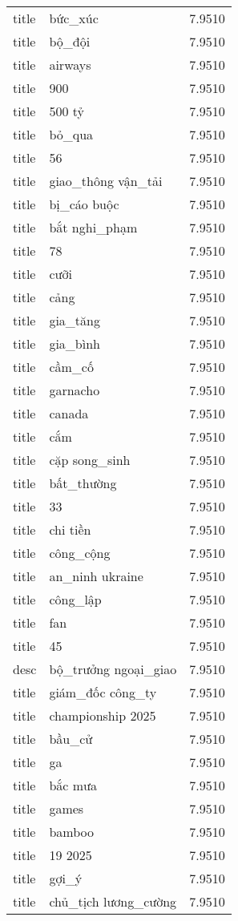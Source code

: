 \documentclass{article}
\begin{document}
\begin{tabular}{lll}
title & bức\_xúc & 7.9510\\
title & bộ\_đội & 7.9510\\
title & airways & 7.9510\\
title & 900 & 7.9510\\
title & 500 tỷ & 7.9510\\
title & bỏ\_qua & 7.9510\\
title & 56 & 7.9510\\
title & giao\_thông vận\_tải & 7.9510\\
title & bị\_cáo buộc & 7.9510\\
title & bắt nghi\_phạm & 7.9510\\
title & 78 & 7.9510\\
title & cưỡi & 7.9510\\
title & cảng & 7.9510\\
title & gia\_tăng & 7.9510\\
title & gia\_bình & 7.9510\\
title & cầm\_cố & 7.9510\\
title & garnacho & 7.9510\\
title & canada & 7.9510\\
title & cắm & 7.9510\\
title & cặp song\_sinh & 7.9510\\
title & bất\_thường & 7.9510\\
title & 33 & 7.9510\\
title & chi tiền & 7.9510\\
title & công\_cộng & 7.9510\\
title & an\_ninh ukraine & 7.9510\\
title & công\_lập & 7.9510\\
title & fan & 7.9510\\
title & 45 & 7.9510\\
desc & bộ\_trưởng ngoại\_giao & 7.9510\\
title & giám\_đốc công\_ty & 7.9510\\
title & championship 2025 & 7.9510\\
title & bầu\_cử & 7.9510\\
title & ga & 7.9510\\
title & bắc mưa & 7.9510\\
title & games & 7.9510\\
title & bamboo & 7.9510\\
title & 19 2025 & 7.9510\\
title & gợi\_ý & 7.9510\\
title & chủ\_tịch lương\_cường & 7.9510\\

\end{tabular}
\end{document}
